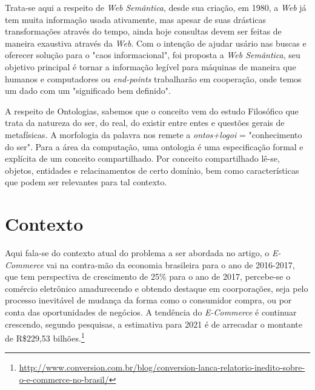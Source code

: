 Trata-se aqui a respeito de \textit{Web Semântica}, desde sua criação, em 1980, a \textit{Web} já tem muita informação usada ativamente, mas apesar de suas drásticas transformações através do tempo, ainda hoje consultas devem ser feitas de maneira exaustiva através da \textit{Web}. Com o intenção de ajudar usário nas buscas e oferecer solução para o "caos informacional", foi proposta a \textit{Web Semântica}, seu objetivo principal é tornar a informação legível para máquinas de maneira que humanos e computadores ou \textit{end-points} trabalharão em cooperação, onde temos um dado com um "significado bem definido"\cite{berners:2001}.

A respeito de Ontologias, sabemos que o conceito vem do estudo Filosófico que trata da natureza do ser, do real, do existir entre entes e questões gerais de metafísicas. A morfologia da palavra nos remete a \textit{ontos+logoi} = "conhecimento do ser". Para a área da computação, uma ontologia é uma especificação formal e explícita de um conceito compartilhado. Por conceito compartilhado lê-se, objetos, entidades e relacinamentos de certo domínio, bem como características que podem ser relevantes para tal contexto\cite{gruber:1992}. 

\section{Contexto}

Aqui fala-se do contexto atual do problema a ser abordada no artigo, o \textit{E-Commerce} vai na contra-mão da economia brasileira para o ano de 2016-2017, que tem perspectiva de crescimento de 25\% para o ano de 2017, percebe-se o comércio eletrônico amadurecendo e obtendo destaque em coorporações, seja pelo processo inevitável de mudança da forma como o consumidor compra, ou por conta das oportunidades de negócios\cite{roque:2012}. A tendência do \textit{E-Commerce} é continuar crescendo, segundo pesquisas, a estimativa para 2021 é de arrecadar o montante de R\$229,53 bilhões.\footnote{\url{http://www.conversion.com.br/blog/conversion-lanca-relatorio-inedito-sobre-o-e-commerce-no-brasil/}}

